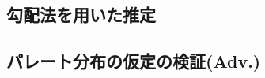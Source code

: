 \documentclass{article}
\begin{document}
\subsection{勾配法を用いた推定}

\subsection{パレート分布の仮定の検証(Adv.)}
\end{document}
